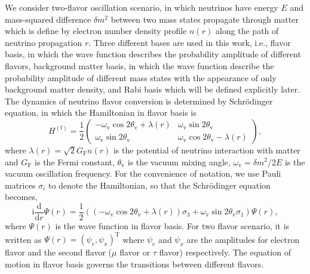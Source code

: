 \documentclass[%
reprint,
 amsmath,amssymb,
 aps,
]{revtex4-1}
\begin{document}
We consider two-flavor oscillation scenario, in which neutrinos have energy $E$ and mass-squared difference $\delta m^2$ between two mass states propagate through matter which is define by electron number density profile $n(r)$ along the path of neutrino propagation $r$. Three different bases are used in this work, i.e., flavor basis, in which the wave function describes the probability amplitude of different flavors, background matter basis, in which the wave function describe the probability amplitude of different mass states with the appearance of only background matter density, and Rabi basis which will be defined explicitly later. The dynamics of neutrino flavor conversion is determined by Schr\"{o}dinger equation, in which the Hamiltonian in flavor basis is
\begin{equation}
    H^{(\mathrm{f})} =  \frac{1}{2} \begin{pmatrix}
    -\omega_{\mathrm{v}} \cos 2\theta_{\mathrm{v}} + \lambda(r) & \omega_{\mathrm{v}}\sin 2\theta_{\mathrm{v}} \\
   \omega_{\mathrm{v}} \sin 2\theta_{\mathrm{v}} & \omega_{\mathrm{v}} \cos 2\theta_{\mathrm{v}} - \lambda(r)
    \end{pmatrix},
\end{equation}
where $\lambda(r)= \sqrt{2}G_{\mathrm F} n(r)$ is the potential of neutrino interaction with matter and $G_{\mathrm F}$ is the Fermi constant, $\theta_{\mathrm{v}}$ is the vacuum mixing angle, $\omega_{\mathrm{v}} = \delta m^2/2E$ is the vacuum oscillation frequency. For the convenience of notation, we use Pauli matrices $\sigma_i$ to denote the Hamiltonian, so that the Schr\"{o}dinger equation becomes,
\begin{equation}
    \mathrm i\frac{\mathrm d}{\mathrm d r}\Psi(r) = \frac{1}{2} \left(  
    (- \omega_{\mathrm{v}}\cos 2\theta_{\mathrm{v}} + \lambda(r) ) \sigma_3 + \omega_{\mathrm{v}}\sin 2\theta_{\mathrm{v}} \sigma_1 
    \right)
    \Psi(r),
\end{equation}
where $\Psi(r)$ is the wave function in flavor basis. For two flavor scenario, it is written as $ \Psi(r) = \left(
    \psi_{e} ,
    \psi_{x}
    \right)^{\mathrm{T}}$ 
where $\psi_{e}$ and $\psi_{x}$ are the amplitudes for electron flavor and the second flavor ($\mu$ flavor or $\tau$ flavor) respectively. The equation of motion in flavor basis governs the transitions between different flavors.
\end{document}
